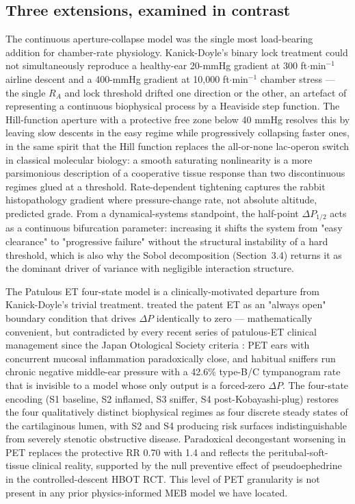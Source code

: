 \documentclass[11pt,a4paper]{article}
\begin{document}
\subsection{Three extensions, examined in contrast}

The continuous aperture-collapse model was the single most load-bearing addition for chamber-rate physiology. Kanick-Doyle's binary lock treatment could not simultaneously reproduce a healthy-ear 20-mmHg gradient at 300 ft$\cdot$min$^{-1}$ airline descent and a 400-mmHg gradient at 10,000 ft$\cdot$min$^{-1}$ chamber stress --- the single $R_A$ and lock threshold drifted one direction or the other, an artefact of representing a continuous biophysical process by a Heaviside step function. The Hill-function aperture with a protective free zone below 40 mmHg resolves this by leaving slow descents in the easy regime while progressively collapsing faster ones, in the same spirit that the Hill function replaces the all-or-none lac-operon switch in classical molecular biology: a smooth saturating nonlinearity is a more parsimonious description of a cooperative tissue response than two discontinuous regimes glued at a threshold. Rate-dependent tightening captures the \citet{Wang2019} rabbit histopathology gradient where pressure-change rate, not absolute altitude, predicted grade. From a dynamical-systems standpoint, the half-point $\Delta P_{1/2}$ acts as a continuous bifurcation parameter: increasing it shifts the system from "easy clearance" to "progressive failure" without the structural instability of a hard threshold, which is also why the Sobol decomposition (Section~3.4) returns it as the dominant driver of variance with negligible interaction structure.

The Patulous ET four-state model is a clinically-motivated departure from Kanick-Doyle's trivial treatment. \citet{Kanick2005} treated the patent ET as an "always open" boundary condition that drives $\Delta P$ identically to zero --- mathematically convenient, but contradicted by every recent series of patulous-ET clinical management since the Japan Otological Society criteria \citep{Kobayashi2018,Kikuchi2017}: PET ears with concurrent mucosal inflammation paradoxically close, and habitual sniffers run chronic negative middle-ear pressure with a 42.6\% type-B/C tympanogram rate \citep{Shindo2025} that is invisible to a model whose only output is a forced-zero $\Delta P$. The four-state encoding (S1 baseline, S2 inflamed, S3 sniffer, S4 post-Kobayashi-plug) restores the four qualitatively distinct biophysical regimes as four discrete steady states of the cartilaginous lumen, with S2 and S4 producing risk surfaces indistinguishable from severely stenotic obstructive disease. Paradoxical decongestant worsening in PET replaces the protective RR 0.70 with 1.4 and reflects the peritubal-soft-tissue clinical reality, supported by the null preventive effect of pseudoephedrine in the controlled-descent \citet{Moayedi2025} HBOT RCT. This level of PET granularity is not present in any prior physics-informed MEB model we have located.
\end{document}
